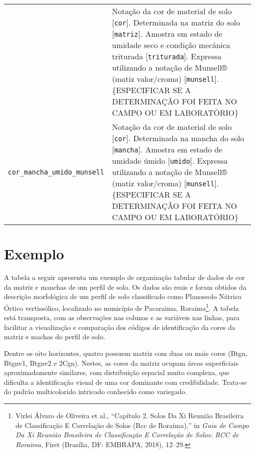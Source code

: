 \documentclass[
  a4paper,
  dvipsnames]{tufte-book}
\begin{document}
\begin{longtable}[]{@{}ll@{}}
\begin{minipage}[t]{0.51\columnwidth}
\end{minipage} & \begin{minipage}[t]{0.43\columnwidth}\raggedright
Notação da cor de material de solo {[}\texttt{cor}{]}. Determinada na matriz do solo {[}\texttt{matriz}{]}. Amostra em estado de umidade seco e condição mecânica triturada {[}\texttt{triturada}{]}. Expressa utilizando a notação de Munsell® (matiz valor/croma) {[}\texttt{munsell}{]}. \{ESPECIFICAR SE A DETERMINAÇÃO FOI FEITA NO CAMPO OU EM LABORATÓRIO\}\strut
\end{minipage}\tabularnewline
\begin{minipage}[t]{0.51\columnwidth}\raggedright
\texttt{cor\_mancha\_umido\_munsell}\strut
\end{minipage} & \begin{minipage}[t]{0.43\columnwidth}\raggedright
Notação da cor de material de solo {[}\texttt{cor}{]}. Determinada na mancha do solo {[}\texttt{mancha}{]}. Amostra em estado de umidade úmido {[}\texttt{umido}{]}. Expressa utilizando a notação de Munsell® (matiz valor/croma) {[}\texttt{munsell}{]}. \{ESPECIFICAR SE A DETERMINAÇÃO FOI FEITA NO CAMPO OU EM LABORATÓRIO\}\strut
\end{minipage}\tabularnewline
\bottomrule
\end{longtable}

\hypertarget{exemplo}{%
\section{Exemplo}\label{exemplo}}

A tabela a seguir apresenta um exemplo de organização tabular de dados de cor da matriz e manchas de um perfil de solo. Os dados são reais e foram obtidos da descrição morfológica de um perfil de solo classificado como Planossolo Nátrico Órtico vertissólico, localizado no município de Pacaraima, Roraima\footnote{Virlei Álvaro de Oliveira et al., ``Capítulo 2. Solos Da Xi Reunião Brasileira de Classificação E Correlação de Solos (Rcc de Roraima),'' in \emph{Guia de Campo Da Xi Reunião Brasileira de Classificação E Correlação de Solos: RCC de Roraima}, First (Brasília, DF: EMBRAPA, 2018), 12--29.}. A tabela está transposta, com as observações nas colunas e as variáveis nas linhas, para facilitar a visualização e comparação dos códigos de identificação da cores da matriz e machas do perfil de solo.

Dentre os oito horizontes, quatro possuem matriz com duas ou mais cores (Btgn, Btgnv1, Btgnv2 e 2Cgn). Nestes, as cores da matriz ocupam áreas superficiais aproximadamente similares, com distribuição espacial muito complexa, que dificulta a identificação visual de uma cor dominante com credibilidade. Trata-se do padrão multicolorido intricado conhecido como variegado.
\end{document}
